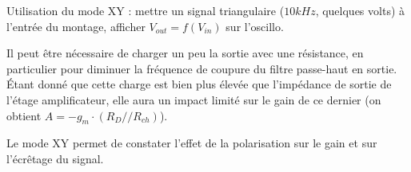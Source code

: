 \documentclass{../template/labo}
\begin{document}
\begin{manip}
{
Utilisation du mode XY :
mettre un signal triangulaire ($10kHz$, quelques volts) à l'entrée du montage, afficher $V_{out}=f(V_{in})$ sur l'oscillo.

 Il peut être nécessaire de charger un peu la sortie avec une résistance, en particulier pour diminuer la fréquence de coupure du filtre passe-haut en sortie.
 Étant donné que cette charge est bien plus élevée que l'impédance de sortie de l'étage amplificateur, elle aura un impact limité sur le gain de ce dernier (on obtient $A = -g_m \cdot (R_D // R_{ch})$).

Le mode XY permet de constater l'effet de la polarisation sur le gain et sur l'écrêtage du signal.
}
\end{manip}




\clearpage
\end{document}
